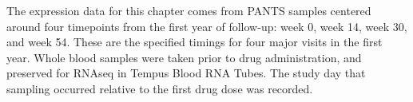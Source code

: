 \begin{outline}
%
%
%

%
The expression data for this chapter comes from \gls{PANTS} samples centered around four timepoints from the first year of follow-up: week 0, week 14, week 30, and week 54.
These are the specified timings for four major visits in the first year.
Whole blood samples were taken prior to drug administration, and preserved for \gls{RNAseq} in Tempus Blood RNA Tubes.
The study day that sampling occurred relative to the first drug dose was recorded.


\end{outline}
